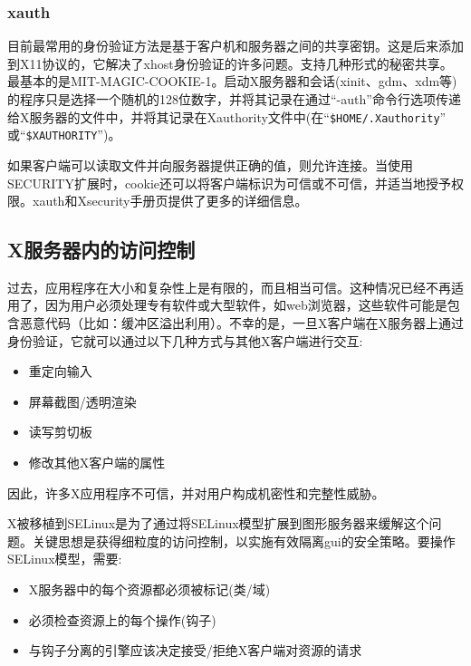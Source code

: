 \subsubsection{xauth}

目前最常用的身份验证方法是基于客户机和服务器之间的共享密钥。这是后来添加到X11协议的，它解决了xhost身份验证的许多问题。支持几种形式的秘密共享。最基本的是MIT-MAGIC-COOKIE-1。启动X服务器和会话(xinit、gdm、xdm等)的程序只是选择一个随机的128位数字，并将其记录在通过“-auth”命令行选项传递给X服务器的文件中，并将其记录在Xauthority文件中(在“\lstinline|$HOME/.Xauthority|”
或“\lstinline|$XAUTHORITY|”)。

如果客户端可以读取文件并向服务器提供正确的值，则允许连接。当使用SECURITY扩展时，cookie还可以将客户端标识为可信或不可信，并适当地授予权限。xauth和Xsecurity手册页提供了更多的详细信息。

\subsection{X服务器内的访问控制}

过去，应用程序在大小和复杂性上是有限的，而且相当可信。这种情况已经不再适用了，因为用户必须处理专有软件或大型软件，如web浏览器，这些软件可能是包含恶意代码（比如：缓冲区溢出利用）。不幸的是，一旦X客户端在X服务器上通过身份验证，它就可以通过以下几种方式与其他X客户端进行交互:

\vspace{-5mm}

\begin{itemize}
	\item 重定向输入
	\item 屏幕截图/透明渲染
	\item 读写剪切板
	\item 修改其他X客户端的属性
\end{itemize}

\noindent 因此，许多X应用程序不可信，并对用户构成机密性和完整性威胁。

X被移植到SELinux是为了通过将SELinux模型扩展到图形服务器来缓解这个问题。关键思想是获得细粒度的访问控制，以实施有效隔离gui的安全策略。要操作SELinux模型，需要:

\vspace{-5mm}

\begin{itemize}
	\item X服务器中的每个资源都必须被标记(类/域)
	\item 必须检查资源上的每个操作(钩子)
	\item 与钩子分离的引擎应该决定接受/拒绝X客户端对资源的请求
\end{itemize}

